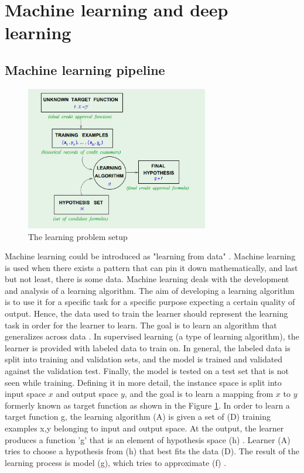 \section{Machine learning and deep learning}
\subsection{Machine learning pipeline}
\begin{figure}[t]
            \includegraphics[width=8cm]{thesis/figures/MLpipeline.PNG}
            \centering
            \caption{The learning problem setup\cite{abu2012learning}}
            \label{fig:The learning problem setup}
        \end{figure}
Machine learning could be introduced as "learning from data" \cite{abu2012learning}. Machine learning is used when there exists a pattern that can pin it down mathematically, and last but not least, there is some data\cite{abu2012learning}. Machine learning deals with the development and analysis of a learning algorithm.  The aim of developing a learning algorithm is to use it for a specific task for a specific purpose expecting a certain quality of output\cite{abu2012learning}.  Hence, the data used to train the learner should represent the learning task in order for the learner to learn.  The goal is to learn an algorithm that generalizes across data \cite{abu2012learning}. In supervised learning (a type of learning algorithm), the learner is provided with labeled data to train on. In general, the labeled data is split into training and validation sets, and the model is trained and validated against the validation test. Finally, the model is tested on a test set that is not seen while training\cite{abu2012learning}. Defining it in more detail, the instance space is split into input space $x$ and output space $y$, and the goal is to learn a mapping from $x$ to $y$ formerly known as target function as shown in the Figure \ref{fig:The learning problem setup}. In order to learn a target function g, the learning algorithm (A) is given a set of (D) training examples {x,y} belonging to input and output space\cite{abu2012learning}. At the output, the learner produces a function 'g' that is an element of hypothesis space (h) \cite{abu2012learning}. Learner (A) tries to choose a hypothesis from (h) that best fits the data (D). The result of the learning process is model (g), which tries to approximate (f)  \cite{abu2012learning}.
